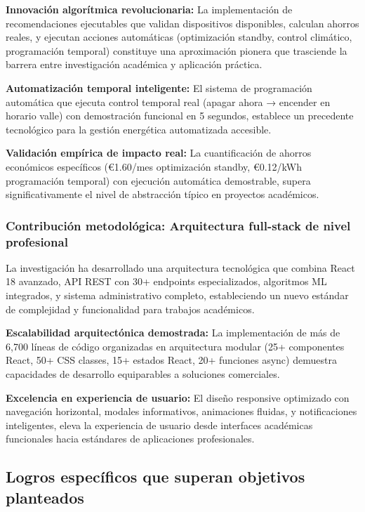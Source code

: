 \textbf{Innovación algorítmica revolucionaria:} La implementación de recomendaciones ejecutables que validan dispositivos disponibles, calculan ahorros reales, y ejecutan acciones automáticas (optimización standby, control climático, programación temporal) constituye una aproximación pionera que trasciende la barrera entre investigación académica y aplicación práctica.

\textbf{Automatización temporal inteligente:} El sistema de programación automática que ejecuta control temporal real (apagar ahora → encender en horario valle) con demostración funcional en 5 segundos, establece un precedente tecnológico para la gestión energética automatizada accesible.

\textbf{Validación empírica de impacto real:} La cuantificación de ahorros económicos específicos (€1.60/mes optimización standby, €0.12/kWh programación temporal) con ejecución automática demostrable, supera significativamente el nivel de abstracción típico en proyectos académicos.

\subsubsection{Contribución metodológica: Arquitectura full-stack de nivel profesional}

La investigación ha desarrollado una arquitectura tecnológica que combina React 18 avanzado, API REST con 30+ endpoints especializados, algoritmos ML integrados, y sistema administrativo completo, estableciendo un nuevo estándar de complejidad y funcionalidad para trabajos académicos.

\textbf{Escalabilidad arquitectónica demostrada:} La implementación de más de 6,700 líneas de código organizadas en arquitectura modular (25+ componentes React, 50+ CSS classes, 15+ estados React, 20+ funciones async) demuestra capacidades de desarrollo equiparables a soluciones comerciales.

\textbf{Excelencia en experiencia de usuario:} El diseño responsive optimizado con navegación horizontal, modales informativos, animaciones fluidas, y notificaciones inteligentes, eleva la experiencia de usuario desde interfaces académicas funcionales hacia estándares de aplicaciones profesionales.

\subsection{Logros específicos que superan objetivos planteados}


